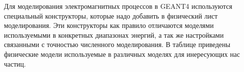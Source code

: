 Для моделирования электромагнитных процессов в GEANT4 используются специальный конструкторы, которые надо добавить в физический лист моделирования. Эти конструкторы как правило отличаются моделями используемыми в конкретных диапазонах энергий, а так же настройками связанными с точностью численного моделирования. В таблице приведены физические модели используемые в различных моделях для инересующих нас частиц.
%
%

